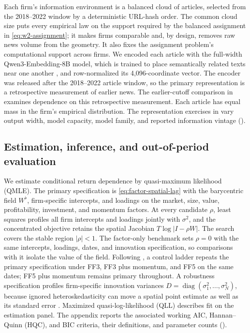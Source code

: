 Each firm's information environment is a balanced cloud of
 articles, selected from the 2018--2022
window by a deterministic URL-hash order.
The common cloud size puts every empirical law on the support required by the
balanced assignment in \eqref{eq:w2-assignment}; it makes firms comparable and,
by design, removes raw news volume from the geometry.
It also fixes the assignment problem's computational support across firms.
We encoded each article with the full-width Qwen3-Embedding-8B model, which is
trained to place semantically related texts near one another
\citep{qwen3_embedding_2025}, and row-normalized its 4,096-coordinate vector.
The encoder was released after the 2018--2022 article window, so the primary
representation is a retrospective measurement of earlier news.
The earlier-cutoff comparison in 
examines dependence on this retrospective measurement.
Each article has equal mass in the firm's empirical distribution.
The representation exercises in  vary output
width, model capacity, model family, and reported information vintage
().

\subsection{Estimation, inference, and out-of-period evaluation}
\label{sec:estimation}

We estimate conditional return dependence by quasi-maximum likelihood
(QMLE).
The primary specification is
\eqref{eq:factor-spatial-lag} with the barycentric field $W^\flat$, firm-specific
intercepts, and loadings on the market, size, value,
profitability, investment, and momentum factors.
At every candidate $\rho$, least squares profiles all firm intercepts and
loadings jointly with $\sigma^2$, and the concentrated objective retains the
spatial Jacobian $T\log|I-\rho W|$.
The search covers the stable region $|\rho|<1$.
The factor-only benchmark sets $\rho=0$ with the same intercepts, loadings,
dates, and innovation specification, so comparisons with it isolate the value
of the field.
Following \citet{ge_news-implied_2023}, a control ladder repeats the primary
specification under FF3, FF3 plus momentum, and FF5 on the same dates; FF5 plus
momentum remains primary throughout.
A robustness specification profiles firm-specific innovation variances
$D=\operatorname{diag}(\sigma_1^2,\ldots,\sigma_N^2)$, because ignored
heteroskedasticity can move a spatial point estimate as well as its standard
error \citep{kelejian_prucha_2010}.
Maximized quasi-log-likelihood (QLL) describes fit on the estimation panel.
The appendix reports the associated working AIC, Hannan--Quinn (HQC), and BIC
criteria, their definitions, and parameter counts
().

